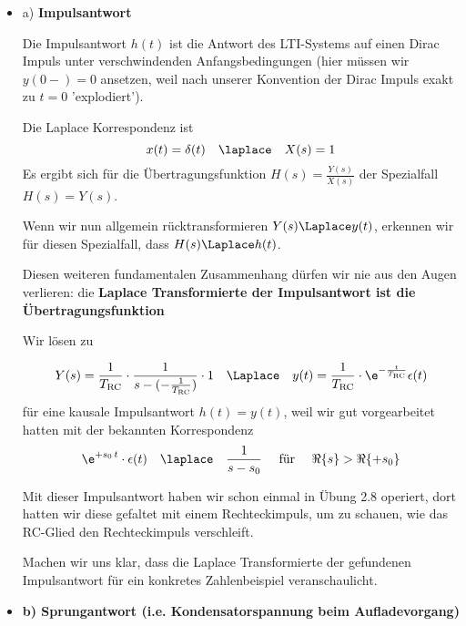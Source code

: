 \begin{Loesung}


\begin{itemize}
  \item a) \textbf{Impulsantwort}

  Die Impulsantwort $h(t)$ ist die Antwort des LTI-Systems auf einen Dirac Impuls unter
  verschwindenden Anfangsbedingungen (hier müssen wir $y(0-)=0$ ansetzen, weil
  nach unserer Konvention der Dirac Impuls exakt zu $t=0$ 'explodiert').

  Die Laplace Korrespondenz ist
  \begin{equation}
  x(t)=\delta(t) \quad\laplace\quad X(s) = 1
  \end{equation}
  Es ergibt sich für die Übertragungsfunktion $H(s)=\frac{Y(s)}{X(s)}$
  der Spezialfall $H(s)=Y(s)$.

  Wenn wir nun allgemein rücktransformieren $Y(s) \Laplace y(t)$, erkennen wir
  für diesen Spezialfall, dass $H(s) \Laplace h(t)$.

  Diesen weiteren fundamentalen Zusammenhang dürfen wir nie aus den Augen verlieren:
  die \textbf{Laplace Transformierte der Impulsantwort ist die Übertragungsfunktion}

  Wir lösen zu

  \begin{align}
  Y(s) = \frac{1}{T_\mathrm{RC}}\cdot\frac{1}{s - (-\frac{1}{T_\mathrm{RC}})} \cdot 1
  \quad\Laplace\quad
  y(t) = \frac{1}{T_\mathrm{RC}} \cdot \e^{-\frac{t}{T_\mathrm{RC}}} \epsilon(t)
  \end{align}
  für eine kausale Impulsantwort $h(t)=y(t)$, weil wir gut vorgearbeitet hatten
  mit der bekannten Korrespondenz
  \begin{align}
  \e^{+s_0 \, t} \cdot \epsilon(t) \quad \laplace \quad \frac{1}{s-s_0} \quad\text{ für } \quad\Re\{s\} > \Re\{+s_0\}
  \end{align}

  Mit dieser Impulsantwort haben wir schon einmal in Übung 2.8 operiert, dort
  hatten wir diese gefaltet mit einem Rechteckimpuls, um zu schauen, wie das RC-Glied
  den Rechteckimpuls verschleift.

  Machen wir uns klar, dass 
  die Laplace Transformierte der gefundenen Impulsantwort für ein konkretes
  Zahlenbeispiel veranschaulicht.

  \item \textbf{b) Sprungantwort (i.e. Kondensatorspannung beim Aufladevorgang)}


\end{itemize}
\end{Loesung}
